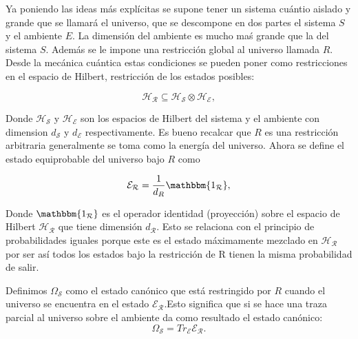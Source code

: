 Ya poniendo las ideas más explícitas se supone tener un sistema cuántio aislado y grande que se llamará el universo, que se descompone en dos partes el sistema $S$ y el ambiente $E$. La dimensión del ambiente es mucho maś grande que la del sistema $S$. Además se le impone una restricción global al universo llamada $R$. Desde la mecánica cuántica estas condiciones se pueden poner como restricciones en el espacio de Hilbert, restricción de los estados posibles:

\begin{equation}
\mathcal{H_{R}}\subseteq \mathcal{H_{S}}\otimes \mathcal{H_{E}},
\end{equation}

Donde $\mathcal{H_{S}}$ y $\mathcal{H_{E}}$ son los espacios de Hilbert del sistema y el ambiente con dimension $d_{\mathcal{S}}$  y $d_{\mathcal{E}}$ respectivamente. Es bueno recalcar que $R$ es una restricción arbitraria generalmente se toma como la energía del universo.
Ahora se define el estado equiprobable del universo bajo $R$ como

\begin{equation}
\mathcal{E_{R}} = \frac{1}{d_{R}} \mathbbm{1_{\mathcal{R}}},
\end{equation}

Donde $\mathbbm{1_{\mathcal{R}}}$ es el operador identidad (proyección) sobre el espacio de Hilbert  $\mathcal{H_{R}}$  que tiene dimensión $d_{\mathcal{R}}$. Esto se relaciona con el principio de probabilidades iguales porque este es el estado máximamente mezclado en $\mathcal{H_{R}}$ por ser así todos los estados bajo la restricción de R tienen la misma probabilidad de salir.

Definimos $\Omega_{\mathcal{S}}$ como el estado canónico que está restringido por $R$ cuando el universo se encuentra en el estado $\mathcal{E_{R}}$.Esto significa que si se hace una traza parcial al universo sobre el ambiente da como resultado el estado canónico:
\begin{equation}
 \Omega_{\mathcal{S}} =Tr_{\mathcal{E}} \mathcal{E_{R}}.
\end{equation}
